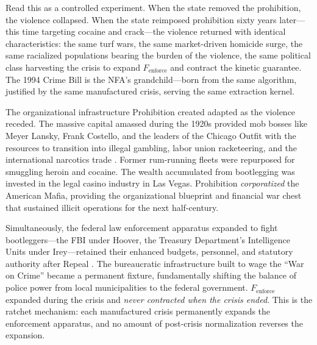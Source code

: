 Read this as a controlled experiment. When the state removed the prohibition, the violence collapsed. When the state reimposed prohibition sixty years later---this time targeting cocaine and crack---the violence returned with identical characteristics: the same turf wars, the same market-driven homicide surge, the same racialized populations bearing the burden of the violence, the same political class harvesting the crisis to expand $F_{\text{enforce}}$ and contract the kinetic guarantee. The 1994 Crime Bill is the NFA's grandchild---born from the same algorithm, justified by the same manufactured crisis, serving the same extraction kernel.

The organizational infrastructure Prohibition created adapted as the violence receded. The massive capital amassed during the 1920s provided mob bosses like Meyer Lansky, Frank Costello, and the leaders of the Chicago Outfit with the resources to transition into illegal gambling, labor union racketeering, and the international narcotics trade \cite{pbs_gangsters}. Former rum-running fleets were repurposed for smuggling heroin and cocaine. The wealth accumulated from bootlegging was invested in the legal casino industry in Las Vegas. Prohibition \textit{corporatized} the American Mafia, providing the organizational blueprint and financial war chest that sustained illicit operations for the next half-century.

Simultaneously, the federal law enforcement apparatus expanded to fight bootleggers---the FBI under Hoover, the Treasury Department's Intelligence Units under Irey---retained their enhanced budgets, personnel, and statutory authority after Repeal \cite{fbi_gangster}. The bureaucratic infrastructure built to wage the ``War on Crime'' became a permanent fixture, fundamentally shifting the balance of police power from local municipalities to the federal government. $F_{\text{enforce}}$ expanded during the crisis and \textit{never contracted when the crisis ended}. This is the ratchet mechanism: each manufactured crisis permanently expands the enforcement apparatus, and no amount of post-crisis normalization reverses the expansion.


